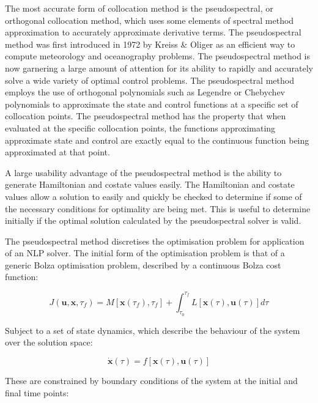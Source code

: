 The most accurate form of collocation method is the pseudospectral, or orthogonal collocation method\cite{Fahroo2000}, which uses some elements of spectral method approximation to accurately approximate derivative terms. The pseudospectral method was first introduced in 1972 by Kreiss \& Oliger \cite{Kreiss1972} as an efficient way to compute meteorology and oceanography problems. The pseudospectral method is now garnering a large amount of attention for its ability to rapidly and accurately solve a wide variety of optimal control problems. The pseudospectral method employs the use of orthogonal polynomials such as Legendre or Chebychev polynomials to approximate the state and control functions at a specific set of collocation points\cite{Fahroo2000,Huntington2007}. The pseudospectral method has the property that when evaluated at the specific collocation points, the functions approximating approximate state and control are exactly equal to the continuous function being approximated at that point. 

A large usability advantage of the pseudospectral method is the ability to generate Hamiltonian and costate values easily\cite{Gong2010,Fahroo2001}. The Hamiltonian and costate values allow a solution to easily and quickly be checked to determine if some of the necessary conditions for optimality are being met. This is useful to determine initially if the optimal solution calculated by the pseudospectral solver is valid.


The pseudospectral method discretises the optimisation problem for application of an NLP solver. The initial form of the optimisation problem is that of a generic Bolza optimisation problem, described by a continuous Bolza cost function:

\begin{equation} \label{eq:cost}
J(\textbf{u},\textbf{x},\tau_f) = M[\textbf{x}(\tau_f),\tau_f] +   \int_{\tau_0}^{\tau_f} L[\textbf{x}(\tau),\textbf{u}(\tau)] d\tau
\end{equation}

Subject to a set of state dynamics, which describe the behaviour of the system over the solution space: 

\begin{equation} \label{eq:state}
\dot{\textbf{x}}(\tau) = f[\textbf{x}(\tau),\textbf{u}(\tau)]
\end{equation}

These are constrained by boundary conditions of the system at the initial and final time points:

